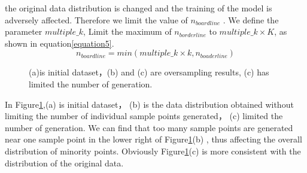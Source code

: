 \documentclass[runningheads]{llncs}
\begin{document}
the original data distribution is changed and the training of the model is adversely affected.
Therefore we limit the value of $n_{boardline}$ . We define the parameter $multiple\_k$,
Limit the maximum of $n_{borderline}$ to $multiple\_k\times K $, as shown in equation\ref{equation5}.
\begin{equation}
  \label{equation5}
  n_{boardline}=min(multiple\_k \times k, n_{boaderline})
\end{equation}
\begin{figure}[htbp]
  \centering
  \quad
  \quad
  \caption{
    (a)is initial dataset，(b) and (c) are oversampling results, (c) has limited the number of generation.}
  \label{fig15}
  \end{figure}

In Figure\ref{fig15},(a) is initial dataset，
(b) is the data distribution obtained without limiting the number of individual sample points generated，
(c) limited the number of generation.
We can find that too many sample points are generated near one sample point in the lower right of Figure\ref{fig15}(b)
, thus affecting the overall distribution of minority points. 
Obviously Figure\ref{fig15}(c) is more consistent with the distribution of the original data.
\end{document}
